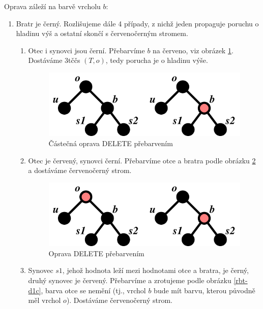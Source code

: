 \begin{samepage}
Oprava záleží na barvě vrcholu $b$:
\begin{enumerate}
\item Bratr je černý. 
Rozlišujeme dále 4 případy, z nichž jeden propaguje poruchu o hladinu
výš a ostatní skončí s červenočerným stromem.

\begin{enumerate}
\item Otec i synovci jsou černí.
Přebarvíme $b$ na červeno, viz obrázek \ref{rbt-d1a}. Dostáváme 3tččs $(T,o)$,
tedy porucha je o hladinu výše.

\begin{figure}[!htb]
\centering\includegraphics{pics/rbt-d1a}
\caption{Částečná oprava DELETE přebarvením}
\label{rbt-d1a}
\end{figure}
\item \label{rbt-cd1b} Otec je červený, synovci černí.
Přebarvíme otce a bratra podle obrázku \ref{rbt-d1b} a dostáváme
červenočerný strom.

\begin{figure}[!htb]
\centering\includegraphics{pics/rbt-d1b}
\caption{Oprava DELETE přebarvením}
\label{rbt-d1b}
\end{figure}
\item \label{rbt-cd1c} Synovec $s1$, jehož hodnota leží mezi hodnotami
otce a bratra, je černý, druhý synovec je červený.
Přebarvíme a zrotujeme podle obrázku \ref{rbt-d1c}, barva otce se
nemění (tj., vrchol $b$ bude mít barvu, kterou původně měl vrchol $o$).
Dostáváme červenočerný strom.


\end{enumerate}
\end{enumerate}
\end{samepage}
